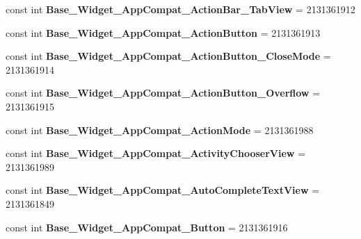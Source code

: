 \begin{DoxyCompactItemize}
const int {\bfseries Base\+\_\+\+Widget\+\_\+\+App\+Compat\+\_\+\+Action\+Bar\+\_\+\+Tab\+View} = 2131361912
\item 
\mbox{\label{class_sample_app_1_1_droid_1_1_resource_1_1_style_aff3614e38fa4b4a0e2398709019b982a}} 
const int {\bfseries Base\+\_\+\+Widget\+\_\+\+App\+Compat\+\_\+\+Action\+Button} = 2131361913
\item 
\mbox{\label{class_sample_app_1_1_droid_1_1_resource_1_1_style_a1327f4620e1bc05f725d05fcefaf232b}} 
const int {\bfseries Base\+\_\+\+Widget\+\_\+\+App\+Compat\+\_\+\+Action\+Button\+\_\+\+Close\+Mode} = 2131361914
\item 
\mbox{\label{class_sample_app_1_1_droid_1_1_resource_1_1_style_adbc157f4d9d1e3f0a6b330a99f6f824f}} 
const int {\bfseries Base\+\_\+\+Widget\+\_\+\+App\+Compat\+\_\+\+Action\+Button\+\_\+\+Overflow} = 2131361915
\item 
\mbox{\label{class_sample_app_1_1_droid_1_1_resource_1_1_style_a0d6536592de394f744615a8a9f2931f6}} 
const int {\bfseries Base\+\_\+\+Widget\+\_\+\+App\+Compat\+\_\+\+Action\+Mode} = 2131361988
\item 
\mbox{\label{class_sample_app_1_1_droid_1_1_resource_1_1_style_ad64ef836cdaddba7734254b3ecb9ae8d}} 
const int {\bfseries Base\+\_\+\+Widget\+\_\+\+App\+Compat\+\_\+\+Activity\+Chooser\+View} = 2131361989
\item 
\mbox{\label{class_sample_app_1_1_droid_1_1_resource_1_1_style_a200c8fafac75fb02d42fc5cc198fdf1f}} 
const int {\bfseries Base\+\_\+\+Widget\+\_\+\+App\+Compat\+\_\+\+Auto\+Complete\+Text\+View} = 2131361849
\item 
\mbox{\label{class_sample_app_1_1_droid_1_1_resource_1_1_style_a275bf075898d18e6dd50782aeaee0b22}} 
const int {\bfseries Base\+\_\+\+Widget\+\_\+\+App\+Compat\+\_\+\+Button} = 2131361916
\item 
\mbox{\label{class_sample_app_1_1_droid_1_1_resource_1_1_style_a198db4bb9ecf32a5d4d66f1c263f8509}} 

\end{DoxyCompactItemize}
